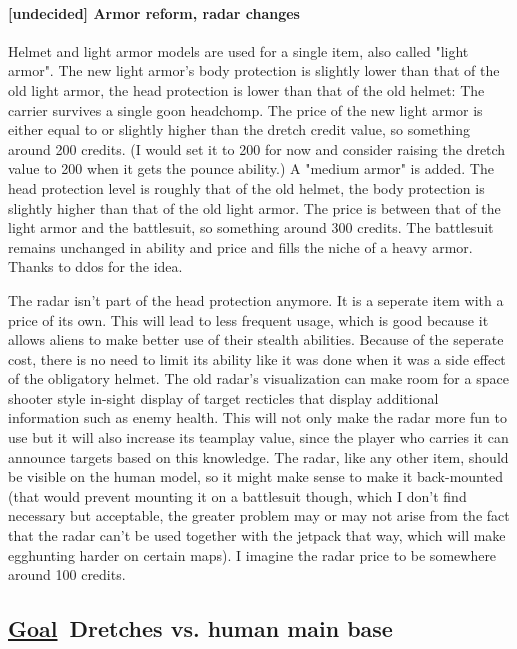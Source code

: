 \documentclass{scrartcl}
\newcommand{\goal}     [0]{\textbf{\underline{Goal}\ }}
\newcommand{\undecided}[0]{\textcolor{undecided}{\textbf{[undecided] }}}
\begin{document}
\paragraph{\undecided Armor reform, radar changes}

Helmet and light armor models are used for a single item, also called "light armor". The new light armor's body protection is slightly lower than that of the old light armor, the head protection is lower than that of the old helmet: The carrier survives a single goon headchomp. The price of the new light armor is either equal to or slightly higher than the dretch credit value, so something around 200 credits. (I would set it to 200 for now and consider raising the dretch value to 200 when it gets the pounce ability.) A "medium armor" is added. The head protection level is roughly that of the old helmet, the body protection is slightly higher than that of the old light armor. The price is between that of the light armor and the battlesuit, so something around 300 credits. The battlesuit remains unchanged in ability and price and fills the niche of a heavy armor. Thanks to ddos for the idea.

The radar isn't part of the head protection anymore. It is a seperate item with a price of its own. This will lead to less frequent usage, which is good because it allows aliens to make better use of their stealth abilities. Because of the seperate cost, there is no need to limit its ability like it was done when it was a side effect of the obligatory helmet. The old radar's visualization can make room for a space shooter style in-sight display of target recticles that display additional information such as enemy health. This will not only make the radar more fun to use but it will also increase its teamplay value, since the player who carries it can announce targets based on this knowledge. The radar, like any other item, should be visible on the human model, so it might make sense to make it back-mounted (that would prevent mounting it on a battlesuit though, which I don't find necessary but acceptable, the greater problem may or may not arise from the fact that the radar can't be used together with the jetpack that way, which will make egghunting harder on certain maps). I imagine the radar price to be somewhere around 100 credits.

\subsection{\goal Dretches vs. human main base}
\end{document}
